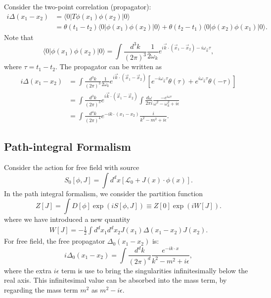 Consider the two-point correlation (propagator):
\begin{equation*}
\begin{aligned}
	i\Delta(x_1-x_2) &= \langle 0|T \phi(x_1) \phi(x_2) |0\rangle \\
	&= \theta(t_1-t_2) \langle 0|\phi(x_1) \phi(x_2) |0\rangle 
	+ \theta(t_2-t_1) \langle 0|\phi(x_2) \phi(x_1) |0\rangle.
\end{aligned}
\end{equation*}
Note that
\begin{equation}
	\langle 0|\phi(x_1) \phi(x_2) |0\rangle
	= \int\frac{d^{3} k}{(2\pi)^{3}}\frac{1}{2\omega_k} e^{i\vec k\cdot (\vec x_1-\vec x_2)-i\omega_{\vec k}\tau},
\end{equation}
where $\tau =t_1-t_2$.
The propagator can be written as
\begin{equation}
\begin{aligned}
	i\Delta(x_1-x_2) 
	&= \int\frac{d^{3} k}{(2\pi)^{3}}\frac{1}{2\omega_k} e^{i\vec k\cdot (\vec x_1-\vec x_2)}\left[e^{-i\omega_{\vec k}\tau}\theta(\tau)+e^{i\omega_{\vec k}\tau}\theta(-\tau)\right] \\
	&= \int\frac{d^{3} k}{(2\pi)^{3}} e^{i\vec k\cdot (\vec x_1-\vec x_2)}\int \frac{d\omega}{2\pi i}\frac{-e^{i\omega\tau}}{\omega^2-\omega_k^2+i\epsilon} \\
	&= \int\frac{d^{4} k}{(2\pi)^{4}} e^{-i k\cdot (x_1-x_2)}\frac{i}{k^2-m^2+i\epsilon}.
\end{aligned}
\end{equation}


\subsection{Path-integral Formalism}
Consider the action for free field with source
\begin{equation}
	S_0[\phi,J]
	= \int d^dx\left[\mathcal{L}_0 + J(x)\cdot\phi(x) \right].
\end{equation}
In the path integral formalism, we consider the partition function 
\begin{equation}
	Z[J] = \int D[\phi] \exp(iS[\phi,J])
	\equiv Z[0] \exp(iW[J]).
\end{equation}
where we have introduced a new quantity
\begin{equation}
\begin{aligned}
	W[J] = -\frac{1}{2}\int d^dx_1 d^dx_2 J(x_1)\Delta(x_1-x_2)J(x_2).
\end{aligned}
\end{equation}
For free field, the free propagator $\Delta_0(x_1-x_2)$ is:
\begin{equation}
	i\Delta_0(x_1-x_2) = \int \frac{d^dk}{(2\pi)^d} \frac{e^{-ik\cdot x}}{k^2-m^2+i\epsilon},
	\label{eq:free-rkg-pgt}
\end{equation}
where the extra $i\epsilon$ term is use to bring the singularities infinitesimally below the real axis. 
This infinitesimal value can be absorbed into the mass term, by regarding the mass term $m^2$ as $m^2-i\epsilon$.

